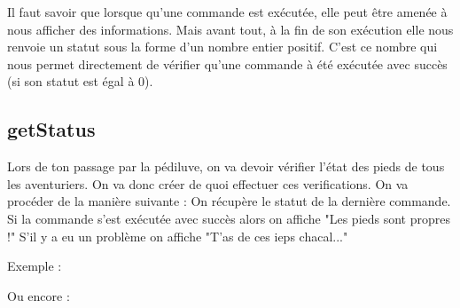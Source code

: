 \documentclass[a4paper, 12pt]{article}
\begin{document}
{    Il faut savoir que lorsque qu'une commande est exécutée, elle peut être amenée à nous afficher
    des informations. Mais avant tout, à la fin de son exécution elle nous renvoie un statut
    sous la forme d'un nombre entier positif. C'est ce nombre qui nous permet directement de
    vérifier qu'une commande à été exécutée avec succès (si son statut est égal à 0).

    \subsection{getStatus}

    Lors de ton passage par la pédiluve, on va devoir vérifier l'état des pieds de tous les
    aventuriers. On va donc créer de quoi effectuer ces verifications.
    \newline \newline
    On va procéder de la manière suivante :
    \newline \newline
    On récupère le statut de la dernière commande. Si la commande
    s'est exécutée avec succès alors on affiche "Les pieds sont propres !"
    S'il y a eu un problème on affiche "T'as de ces ieps chacal..."
    \newline \newline

    Exemple :


    Ou encore :



}
\end{document}
